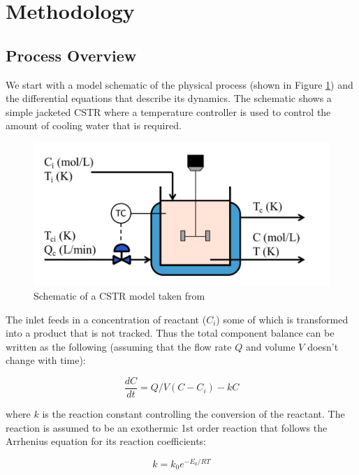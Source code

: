 \documentclass{article}
\begin{document}
\section{Methodology}

\subsection{Process Overview}
\label{sec:process_overview}
We start with a model schematic of the physical process (shown in Figure \ref{fig1}) and the differential equations that describe its dynamics. The schematic shows a simple jacketed CSTR where a temperature controller is used to control the amount of cooling water that is required.
 
\begin{figure}[H]	\centering
\includegraphics[width=\textwidth]{img/CSTR_schematic.png}
\caption{Schematic of a CSTR model taken from \cite{pilario2018canonical}}
\label{fig1}
\end{figure}

The inlet feeds in a concentration of reactant ($C_i$) some of which is transformed into a product that is not tracked. Thus the total component balance can be written as the following (assuming that the flow rate $Q$ and volume $V$ doesn't change with time): 

\begin{equation}
	\frac{dC}{dt} = Q/V(C-C_i)-kC
\end{equation} 

where $k$ is the reaction constant controlling the conversion of the reactant. The reaction is assumed to be an exothermic 1st order reaction that follows the Arrhenius equation for its reaction coefficients:

\begin{equation}
	k = k_0 e^{-E_a/RT}
\end{equation}
\end{document}
